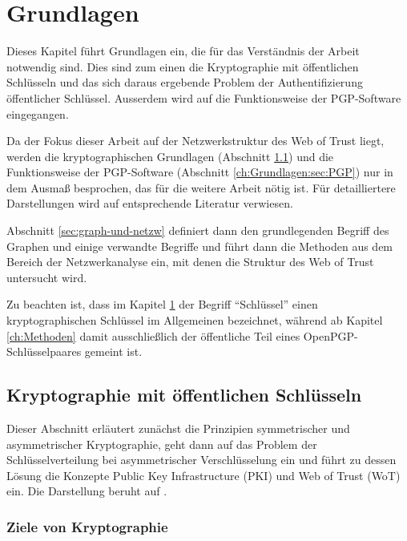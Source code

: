 
\chapter{Grundlagen}
\label{ch:Grundlagen}

Dieses Kapitel führt Grundlagen ein, die für das Verständnis der
Arbeit notwendig sind. Dies sind zum einen die Kryptographie mit
öffentlichen Schlüsseln und das sich daraus ergebende Problem der
Authentifizierung öffentlicher Schlüssel. Ausserdem wird auf die
Funktionsweise der PGP-Software eingegangen.

Da der Fokus dieser Arbeit auf der Netzwerkstruktur des Web of Trust
liegt, werden die kryptographischen Grundlagen (Abschnitt
\ref{ch:Grundlagen:sec:PublicKeyCrypto}) und die Funktionsweise
der PGP-Software (Abschnitt \ref{ch:Grundlagen:sec:PGP}) nur in dem Ausmaß besprochen, das für die weitere
Arbeit nötig ist. Für detailliertere Darstellungen wird auf
entsprechende Literatur verwiesen.

Abschnitt \ref{sec:graph-und-netzw} definiert dann den
grundlegenden Begriff des Graphen und einige verwandte Begriffe und
führt dann die Methoden aus dem Bereich der Netzwerkanalyse ein, mit
denen die Struktur des Web of Trust untersucht wird.

Zu beachten ist, dass im Kapitel \ref{ch:Grundlagen} der Begriff
``Schlüssel'' einen kryptographischen Schlüssel im Allgemeinen
bezeichnet, während ab Kapitel \ref{ch:Methoden} damit
ausschließlich der öffentliche Teil eines OpenPGP-Schlüsselpaares
gemeint ist.

\section{Kryptographie mit öffentlichen Schlüsseln}
\label{ch:Grundlagen:sec:PublicKeyCrypto}

Dieser Abschnitt erläutert zunächst die Prinzipien symmetrischer
und asymmetrischer Kryptographie, geht dann auf das Problem der
Schlüsselverteilung bei asymmetrischer Verschlüsselung ein und
führt zu dessen Lösung die Konzepte Public Key Infrastructure
(PKI) und Web of Trust (WoT) ein. Die Darstellung beruht auf
\cite{Menezes1996}.

\subsection{Ziele von Kryptographie}
\label{sec:ziele-von-krypt}

